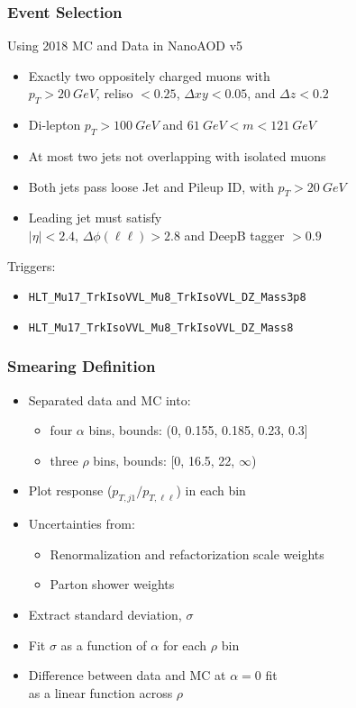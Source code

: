\documentclass{beamer}
\begin{document}
\begin{frame}
  \frametitle{Event Selection}

  Using 2018 MC and Data in NanoAOD v5

  \begin{itemize}
  \item Exactly two oppositely charged muons with \\
    $p_T > \SI{20}{GeV}$, reliso $< 0.25$, $\Delta xy < 0.05$, and $\Delta z < 0.2$
  \item Di-lepton $p_{T} > \SI{100}{GeV}$ and $\SI{61}{GeV} < m < \SI{121}{GeV}$
  \item At most two jets not overlapping with isolated muons
  \item Both jets pass loose Jet and Pileup ID, with $p_T > \SI{20}{GeV}$
  \item Leading jet must satisfy \\
    $|\eta| < 2.4$, $\Delta \phi(\ell\ell) > 2.8$ and DeepB tagger $>0.9$
  \end{itemize}

  Triggers:
  \begin{itemize}
  \item \texttt{HLT\_Mu17\_TrkIsoVVL\_Mu8\_TrkIsoVVL\_DZ\_Mass3p8}
  \item \texttt{HLT\_Mu17\_TrkIsoVVL\_Mu8\_TrkIsoVVL\_DZ\_Mass8}
  \end{itemize}

\end{frame}


\begin{frame}
  \frametitle{Smearing Definition}

  \begin{itemize}
  \item Separated data and MC into:
    \begin{itemize}
    \item four $\alpha$ bins, bounds: (0, 0.155, 0.185, 0.23, 0.3]
    \item three $\rho$ bins, bounds: [0, 16.5, 22, $\infty$)
    \end{itemize}
  \item Plot response ($p_{T, j1}/p_{T,\ell\ell}$) in each bin
  \item Uncertainties from:
    \begin{itemize}
    \item Renormalization and refactorization scale weights
    \item Parton shower weights
    \end{itemize}
  \item Extract standard deviation, $\sigma$
  \item Fit $\sigma$ as a function of $\alpha$ for each $\rho$ bin \\
  \item Difference between data and MC at $\alpha = 0$ fit \\
    as a linear function across $\rho$
  \end{itemize}

\end{frame}
\end{document}
